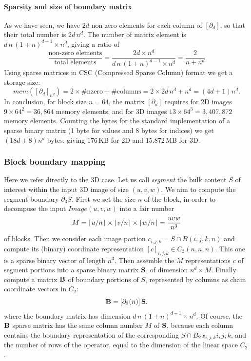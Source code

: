 \paragraph{Sparsity and size of boundary matrix }\label{sec:bbbb} 

As we have seen, we have $2d$ non-zero elements for each column of $[\partial_d]$, so that their total number is $2d\,n^d$. The number of matrix element is $d\,n\,(1+n)^{d-1} \times n^d$, giving a ratio of 
\[
\frac{\mbox{non-zero\ elements}}{\mbox{total\ elements}} = 
\frac{2d\times n^d}{d\,n\,(1+n)^{d-1} \times n^d} =
\frac{2}{n+n^d}
\]
Using sparse matrices in CSC (Compressed Sparse Column) format we get a storage size:
\[
mem([\partial_d]_{n^d}) = 2\times \#\mbox{nzero} + \#\mbox{columns} = 2\times 2d\,n^d + n^d = (4d+1)n^d.
\]
In conclusion, for block size $n=64$, the matrix $[\partial_d]$ requires for 2D images $9\times 64^2=36,864$ memory elements, and for 3D images $13\times 64^3=3,407,872$ memory elements. Counting the bytes for the standard implementation of a sparse binary matrix (1 byte for values and 8 bytes for indices) we get $(18d+8)n^d$ bytes, giving $176$\,KB for 2D and $15.872$\,MB for 3D.

\subsubsection{Block boundary mapping}\label{sec:bbbb}

Here we refer directly to the 3D case.
Let us call \emph{segment} the bulk content $S$ of interest within the input 3D image of size $(u,v,w)$. We aim to compute the segment boundary $\partial_3 S$. 
First we set the size $n$ of the block, in order to decompose the input $Image(u,v,w)$ into a fair number 
\[
M = \left\lceil u/n \right\rceil \times \left\lceil v/n \right\rceil \times \left\lceil w/n \right\rceil = \frac{uvw}{n^3}
\] of blocks. 
Then we consider each image portion $c_{i,j,k} = S\cap B(i,j,k,n)$ and compute its (binary) coordinate representation  $[c]_{i,j,k}\in C_3(n,n,n)$. This one is a sparse binary vector of length $n^3$. Then assemble the $M$ representations $c$ of segment portions into a sparse binary matrix ${\bf S}$, of dimension $n^d \times M$. Finally compute a matrix ${\bf B}$ of boundary portions of $S$, represented by columns as chain coordinate vectors in $C_2$:
\[
{\bf B} = [\partial_3(n)]\, {\bf S}.
\]
where the boundary matrix has dimension $d\,n\,(1+n)^{d-1} \times n^d$.
Of course, the ${\bf B}$ sparse matrix has the same column number $M$ of ${\bf S}$, because each column contains the boundary representation of the corresponding $S\cap Box_{i,j,k}{i,j,k}$, and the number of rows of the operator, equal to the dimension of the linear space $C_2$.

